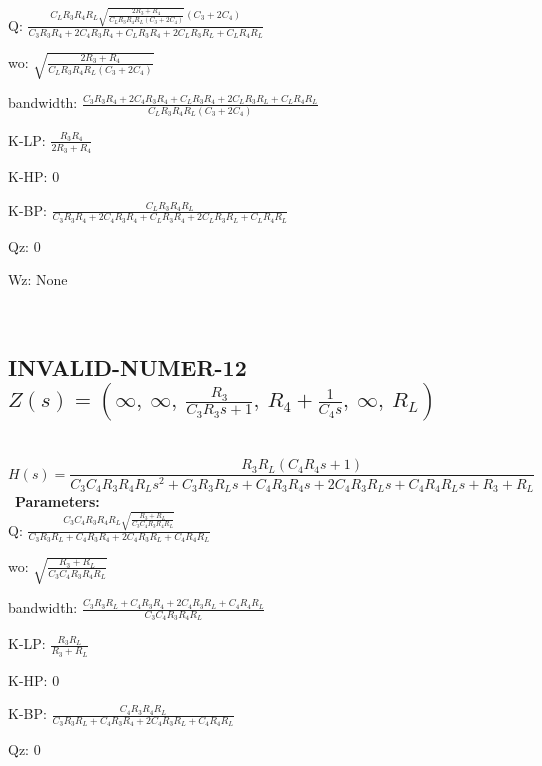 \documentclass{article}
\begin{document}
Q: $\frac{C_{L} R_{3} R_{4} R_{L} \sqrt{\frac{2 R_{3} + R_{4}}{C_{L} R_{3} R_{4} R_{L} \left(C_{3} + 2 C_{4}\right)}} \left(C_{3} + 2 C_{4}\right)}{C_{3} R_{3} R_{4} + 2 C_{4} R_{3} R_{4} + C_{L} R_{3} R_{4} + 2 C_{L} R_{3} R_{L} + C_{L} R_{4} R_{L}}$\ 

wo: $\sqrt{\frac{2 R_{3} + R_{4}}{C_{L} R_{3} R_{4} R_{L} \left(C_{3} + 2 C_{4}\right)}}$\ 

bandwidth: $\frac{C_{3} R_{3} R_{4} + 2 C_{4} R_{3} R_{4} + C_{L} R_{3} R_{4} + 2 C_{L} R_{3} R_{L} + C_{L} R_{4} R_{L}}{C_{L} R_{3} R_{4} R_{L} \left(C_{3} + 2 C_{4}\right)}$\ 

K-LP: $\frac{R_{3} R_{4}}{2 R_{3} + R_{4}}$\ 

K-HP: $0$\ 

K-BP: $\frac{C_{L} R_{3} R_{4} R_{L}}{C_{3} R_{3} R_{4} + 2 C_{4} R_{3} R_{4} + C_{L} R_{3} R_{4} + 2 C_{L} R_{3} R_{L} + C_{L} R_{4} R_{L}}$\ 

Qz: $0$\ 

Wz: $\text{None}$\ 

\ 

\subsection{INVALID-NUMER-12 $Z(s) = \left( \infty, \  \infty, \  \frac{R_{3}}{C_{3} R_{3} s + 1}, \  R_{4} + \frac{1}{C_{4} s}, \  \infty, \  R_{L}\right)$ } \ 
\textbf{\[H(s) = \frac{R_{3} R_{L} \left(C_{4} R_{4} s + 1\right)}{C_{3} C_{4} R_{3} R_{4} R_{L} s^{2} + C_{3} R_{3} R_{L} s + C_{4} R_{3} R_{4} s + 2 C_{4} R_{3} R_{L} s + C_{4} R_{4} R_{L} s + R_{3} + R_{L}}\] } \ 
\textbf{Parameters:}\\ 

Q: $\frac{C_{3} C_{4} R_{3} R_{4} R_{L} \sqrt{\frac{R_{3} + R_{L}}{C_{3} C_{4} R_{3} R_{4} R_{L}}}}{C_{3} R_{3} R_{L} + C_{4} R_{3} R_{4} + 2 C_{4} R_{3} R_{L} + C_{4} R_{4} R_{L}}$\ 

wo: $\sqrt{\frac{R_{3} + R_{L}}{C_{3} C_{4} R_{3} R_{4} R_{L}}}$\ 

bandwidth: $\frac{C_{3} R_{3} R_{L} + C_{4} R_{3} R_{4} + 2 C_{4} R_{3} R_{L} + C_{4} R_{4} R_{L}}{C_{3} C_{4} R_{3} R_{4} R_{L}}$\ 

K-LP: $\frac{R_{3} R_{L}}{R_{3} + R_{L}}$\ 

K-HP: $0$\ 

K-BP: $\frac{C_{4} R_{3} R_{4} R_{L}}{C_{3} R_{3} R_{L} + C_{4} R_{3} R_{4} + 2 C_{4} R_{3} R_{L} + C_{4} R_{4} R_{L}}$\ 

Qz: $0$\ 
\end{document}
